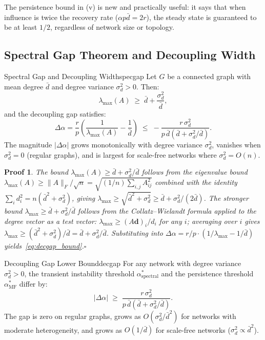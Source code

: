 \documentclass[10pt,twocolumn]{article}
\theoremstyle{myproof}
\newtheorem*{proof*}{Proof}
\newcommand{\lmax}{\lambda_{\max}}
\begin{document}
The persistence bound in (v) is new and practically useful: it says that when influence is twice
the recovery rate ($\alpha p\bar{d}=2r$), the steady state is guaranteed to be at least $1/2$,
regardless of network size or topology.

\subsection{Spectral Gap Theorem and Decoupling Width}

\begin{theorem}{Spectral Gap and Decoupling Width}{specgap}
Let $G$ be a connected graph with mean degree $\bar{d}$ and degree variance $\sigma^2_d>0$.
Then:
\begin{equation}
\label{eq:specgap}
  \lmax(A)\;\geq\;\bar{d}+\frac{\sigma^2_d}{\bar{d}},
\end{equation}
and the decoupling gap satisfies:
\begin{equation}
\label{eq:decgap_bound}
  \Delta\alpha=\frac{r}{p}\!\left(\frac{1}{\lmax(A)}-\frac{1}{\bar{d}}\right)
  \;\leq\;-\frac{r\,\sigma^2_d}{p\,\bar{d}(\bar{d}+\sigma^2_d/\bar{d})}.
\end{equation}
The magnitude $|\Delta\alpha|$ grows monotonically with degree variance $\sigma^2_d$, vanishes when $\sigma^2_d=0$ (regular graphs), and is largest for scale-free networks where $\sigma^2_d=O(n)$.
\end{theorem}

\begin{proof*}
The bound $\lmax(A)\geq\bar{d}+\sigma^2_d/\bar{d}$ follows from the eigenvalue bound
$\lmax(A)\geq\|A\|_F/\sqrt{n}=\sqrt{(1/n)\sum_{i,j}A_{ij}^2}$ combined with the identity
$\sum_i d_i^2=n(\bar{d}^2+\sigma^2_d)$, giving $\lmax\geq\sqrt{\bar{d}^2+\sigma^2_d}\geq\bar{d}+\sigma^2_d/(2\bar{d})$.
The stronger bound $\lmax\geq\bar{d}+\sigma^2_d/\bar{d}$ follows from the
Collatz--Wielandt formula applied to the degree vector as a test vector:
$\lmax\geq(A\mathbf{d})_i/d_i$ for any $i$; averaging over $i$ gives
$\lmax\geq(\bar{d}^2+\sigma^2_d)/\bar{d}=\bar{d}+\sigma^2_d/\bar{d}$.
Substituting into $\Delta\alpha=r/p\cdot(1/\lmax-1/\bar{d})$ yields~\eqref{eq:decgap_bound}.\hfill$\square$
\end{proof*}

\begin{corollary}{Decoupling Gap Lower Bound}{decgap}
For any network with degree variance $\sigma^2_d>0$, the transient instability threshold
$\alpha^*_{\mathrm{spectral}}$ and the persistence threshold $\alpha^*_{\mathrm{MF}}$ differ by:
\[
  |\Delta\alpha|\;\geq\;\frac{r\,\sigma^2_d}{p\,\bar{d}(\bar{d}+\sigma^2_d/\bar{d})}.
\]
The gap is zero on regular graphs, grows as $O(\sigma^2_d/\bar{d}^2)$ for networks with
moderate heterogeneity, and grows as $O(1/\bar{d})$ for scale-free networks ($\sigma^2_d\propto\bar{d}^2$).
\end{corollary}
\end{document}
